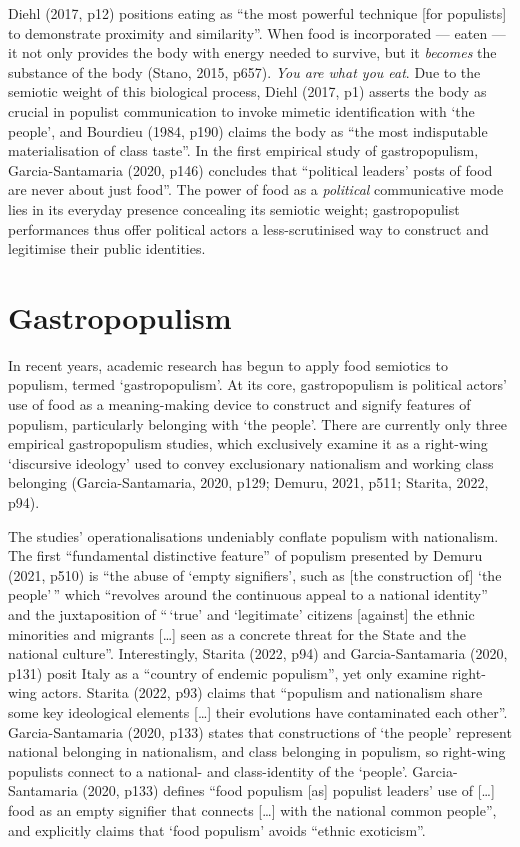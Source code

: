 \documentclass[a4paper, nobind]{templates/ociamthesis}
\begin{document}
Diehl (2017, p12) positions eating as ``the most powerful technique {[}for populists{]} to demonstrate proximity and similarity''. When food is incorporated --- eaten --- it not only provides the body with energy needed to survive, but it \emph{becomes} the substance of the body (Stano, 2015, p657). \emph{You are what you eat}. Due to the semiotic weight of this biological process, Diehl (2017, p1) asserts the body as crucial in populist communication to invoke mimetic identification with `the people', and Bourdieu (1984, p190) claims the body as ``the most indisputable materialisation of class taste''. In the first empirical study of gastropopulism, Garcia-Santamaria (2020, p146) concludes that ``political leaders' posts of food are never about just food''. The power of food as a \emph{political} communicative mode lies in its everyday presence concealing its semiotic weight; gastropopulist performances thus offer political actors a less-scrutinised way to construct and legitimise their public identities.

\hypertarget{gastropopulism}{%
\section{Gastropopulism}\label{gastropopulism}}

In recent years, academic research has begun to apply food semiotics to populism, termed `gastropopulism'. At its core, gastropopulism is political actors' use of food as a meaning-making device to construct and signify features of populism, particularly belonging with `the people'. There are currently only three empirical gastropopulism studies, which exclusively examine it as a right-wing `discursive ideology' used to convey exclusionary nationalism and working class belonging (Garcia-Santamaria, 2020, p129; Demuru, 2021, p511; Starita, 2022, p94).

The studies' operationalisations undeniably conflate populism with nationalism. The first ``fundamental distinctive feature'' of populism presented by Demuru (2021, p510) is ``the abuse of `empty signifiers', such as {[}the construction of{]} `the people'\,'' which ``revolves around the continuous appeal to a national identity'' and the juxtaposition of ``\,`true' and `legitimate' citizens {[}against{]} the ethnic minorities and migrants {[}\ldots{]} seen as a concrete threat for the State and the national culture''. Interestingly, Starita (2022, p94) and Garcia-Santamaria (2020, p131) posit Italy as a ``country of endemic populism'', yet only examine right-wing actors. Starita (2022, p93) claims that ``populism and nationalism share some key ideological elements {[}\ldots{]} their evolutions have contaminated each other''. Garcia-Santamaria (2020, p133) states that constructions of `the people' represent national belonging in nationalism, and class belonging in populism, so right-wing populists connect to a national- and class-identity of the `people'. Garcia-Santamaria (2020, p133) defines ``food populism {[}as{]} populist leaders' use of {[}\ldots{]} food as an empty signifier that connects {[}\ldots{]} with the national common people'', and explicitly claims that `food populism' avoids ``ethnic exoticism''.
\end{document}

